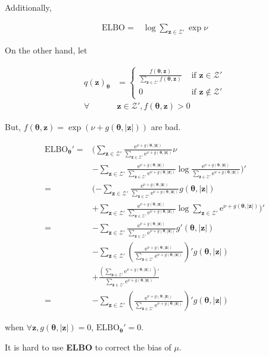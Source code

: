 \documentclass[notitlepage]{article}
\begin{document}
Additionally, 

\begin{align}
    \mathrm{ELBO} =& \log\sum_{\bm{z}\in\mathcal{Z}'}\exp\nu
\end{align}

On the other hand, let

\begin{align}
    q(\bm{z})_{\bm{\theta}} &= \begin{cases}
        \frac{f(\bm{\theta},\bm{z})}{\sum_{\bm{z}\in\mathcal{Z}'}f(\bm{\theta},\bm{z})} & \text{ if } \bm{z} \in \mathcal{Z}' \\ 
        0 & \text{ if } \bm{z} \notin \mathcal{Z}'
    \end{cases} \\
    \forall &\bm{z}\in\mathcal{Z}', f(\bm{\theta},\bm{z}) > 0
\end{align}

But, $f(\bm{\theta},\bm{z})=\exp{(\nu+g(\bm{\theta},|\bm{z}|))}$ are bad. 

\begin{align}
    \mathrm{ELBO}_{\bm{\theta}}' =& (\sum_{\bm{z}\in\mathcal{Z}'}\frac{\mathrm{e}^{\nu+g(\bm{\theta},|\bm{z}|)}}{\sum_{\bm{z}\in\mathcal{Z}'}\mathrm{e}^{\nu+g(\bm{\theta},|\bm{z}|)}}\nu \\
    &- \sum_{\bm{z}\in\mathcal{Z}'}\frac{\mathrm{e}^{\nu+g(\bm{\theta},|\bm{z}|)}}{\sum_{\bm{z}\in\mathcal{Z}'}\mathrm{e}^{\nu+g(\bm{\theta},|\bm{z}|)}}\log\frac{\mathrm{e}^{\nu+g(\bm{\theta},|\bm{z}|)}}{\sum_{\bm{z}\in\mathcal{Z}'}\mathrm{e}^{\nu+g(\bm{\theta},|\bm{z}|)}})' \\
    =& (-\sum_{\bm{z}\in\mathcal{Z}'}\frac{\mathrm{e}^{\nu+g(\bm{\theta},|\bm{z}|)}}{\sum_{\bm{z}\in\mathcal{Z}'}\mathrm{e}^{\nu+g(\bm{\theta},|\bm{z}|)}}g(\bm{\theta},|\bm{z}|) \\
    &+ \sum_{\bm{z}\in\mathcal{Z}'}\frac{\mathrm{e}^{\nu+g(\bm{\theta},|\bm{z}|)}}{\sum_{\bm{z}\in\mathcal{Z}'}\mathrm{e}^{\nu+g(\bm{\theta},|\bm{z}|)}}\log\sum_{\bm{z}\in\mathcal{Z}'}\mathrm{e}^{\nu+g(\bm{\theta},|\bm{z}|)})' \\
    =& -\sum_{\bm{z}\in\mathcal{Z}'}\frac{\mathrm{e}^{\nu+g(\bm{\theta},|\bm{z}|)}}{\sum_{\bm{z}\in\mathcal{Z}'}\mathrm{e}^{\nu+g(\bm{\theta},|\bm{z}|)}}g'(\bm{\theta},|\bm{z}|) \\
    &- \sum_{\bm{z}\in\mathcal{Z}'}(\frac{\mathrm{e}^{\nu+g(\bm{\theta},|\bm{z}|)}}{\sum_{\bm{z}\in\mathcal{Z}'}\mathrm{e}^{\nu+g(\bm{\theta},|\bm{z}|)}})'g(\bm{\theta},|\bm{z}|) \\
    &+ \frac{(\sum_{\bm{z}\in\mathcal{Z}'}\mathrm{e}^{\nu+g(\bm{\theta},|\bm{z}|)})'}{\sum_{\bm{z}\in\mathcal{Z}'}\mathrm{e}^{\nu+g(\bm{\theta},|\bm{z}|)}} \\
    =& -\sum_{\bm{z}\in\mathcal{Z}'}(\frac{\mathrm{e}^{\nu+g(\bm{\theta},|\bm{z}|)}}{\sum_{\bm{z}\in\mathcal{Z}'}\mathrm{e}^{\nu+g(\bm{\theta},|\bm{z}|)}})'g(\bm{\theta},|\bm{z}|)
\end{align}

when $\forall \bm{z}, g(\bm{\theta},|\bm{z}|)=0$, $\mathrm{ELBO}_{\bm{\theta}}'=0$. 

It is hard to use \textbf{ELBO} to correct the bias of $\mu$. 

\end{document}

